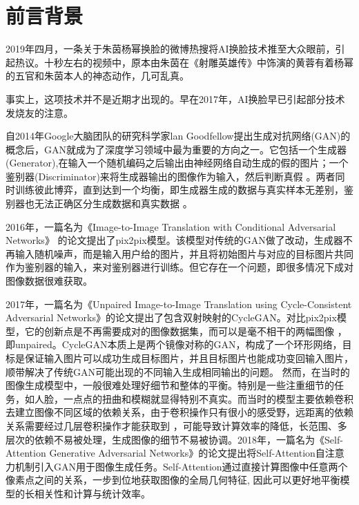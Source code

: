 
\chapter{前言背景}
\label{introduction}
2019年四月，一条关于朱茵杨幂换脸的微博热搜将AI换脸技术推至大众眼前，引起热议。十秒左右的视频中，原本由朱茵在《射雕英雄传》中饰演的黄蓉有着杨幂的五官和朱茵本人的神态动作，几可乱真。

事实上，这项技术并不是近期才出现的。早在2017年，AI换脸早已引起部分技术发烧友的注意。

自2014年Google大脑团队的研究科学家lan Goodfellow提出生成对抗网络(GAN)的概念后，GAN就成为了深度学习领域中最为重要的方向之一。它包括一个生成器(Generator),在输入一个随机编码之后输出由神经网络自动生成的假的图片；一个鉴别器(Discriminator)来将生成器输出的图像作为输入，然后判断真假 \cite{cite_1}。两者同时训练彼此博弈，直到达到一个均衡，即生成器生成的数据与真实样本无差别，鉴别器也无法正确区分生成数据和真实数据 \cite{cite_2}。

2016年，一篇名为《Image-to-Image Translation with Conditional Adversarial Networks》 \cite{cite_3}的论文提出了pix2pix模型。该模型对传统的GAN做了改动，生成器不再输入随机噪声，而是输入用户给的图片，并且将初始图片与对应的目标图片共同作为鉴别器的输入，来对鉴别器进行训练。但它存在一个问题，即很多情况下成对图像数据很难获取。

2017年，一篇名为《Unpaired Image-to-Image Translation using Cycle-Consistent Adversarial Networks》\cite{cite_4}的论文提出了包含双射映射的CycleGAN。对比pix2pix模型，它的创新点是不再需要成对的图像数据集，而可以是毫不相干的两幅图像 \cite{cite_5}，即unpaired。CycleGAN本质上是两个镜像对称的GAN，构成了一个环形网络，目标是保证输入图片可以成功生成目标图片，并且目标图片也能成功变回输入图片，顺带解决了传统GAN可能出现的不同输入生成相同输出的问题。
然而，在当时的图像生成模型中，一般很难处理好细节和整体的平衡。特别是一些注重细节的任务，如人脸，一点点的扭曲和模糊就显得特别不真实。而当时的模型主要依赖卷积去建立图像不同区域的依赖关系，由于卷积操作只有很小的感受野，远距离的依赖关系需要经过几层卷积操作才能获取到 \cite{cite_6}，可能导致计算效率的降低，长范围、多层次的依赖不易被处理，生成图像的细节不易被协调。2018年，一篇名为《Self-Attention Generative Adversarial Networks》\cite{cite_7}的论文提出将Self-Attention自注意力机制引入GAN用于图像生成任务。Self-Attention通过直接计算图像中任意两个像素点之间的关系，一步到位地获取图像的全局几何特征, \cite{cite_8}因此可以更好地平衡模型的长相关性和计算与统计效率。

